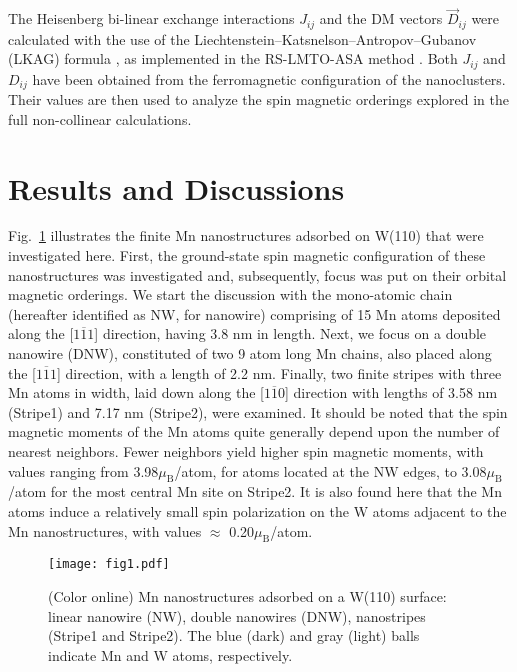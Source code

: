 \documentclass[prl,final,twocolumn]{revtex4-1}
\begin{document}
The Heisenberg bi-linear exchange interactions $J_{ij}$ and the DM vectors $\vec{D}_{ij}$ were calculated with the use of the Liechtenstein–Katsnelson–Antropov–Gubanov (LKAG) formula \cite{liechtensteinLocalSpinDensity1987,PhysRevB.61.8906},
% 
as  implemented in the RS-LMTO-ASA method \cite{frota2000exchange,szilvainteratomicExchangeInteractions2013,szilvaTheoryNoncollinearInteractions2017,cardias2020first,cardiasDzyaloshinskiiMoriyaInteractionAbsence2020}. 
Both $J_{ij}$ and $D_{ij}$ have been obtained from the ferromagnetic configuration of the nanoclusters.
Their values are then used to analyze
the spin magnetic orderings explored in the full non-collinear calculations. 
%  



\par
\section{Results and Discussions}

% 
Fig.~\ref{fig:systems} illustrates the finite Mn nanostructures adsorbed on W(110) that were investigated here. First, the ground-state spin magnetic configuration of these nanostructures was investigated and, subsequently, focus was put on their orbital magnetic orderings. We start the discussion with the mono-atomic chain (hereafter identified as NW, for nanowire) comprising of 15 Mn atoms deposited along the [$1\overline{1}1$] direction, having 3.8 nm in length. Next, we focus on a double nanowire (DNW), constituted of two 9 atom long Mn chains, also placed along the [$1\overline{1}1$] direction, with a length of 2.2 nm. Finally, two finite stripes with three Mn atoms in width, laid down along the [$1\overline{1}0$] direction with lengths of 3.58 nm (Stripe1) and 7.17 nm (Stripe2), were examined.    
It should be noted that the spin magnetic moments of the Mn atoms quite generally depend upon the number of nearest neighbors. Fewer neighbors yield higher spin magnetic moments, with values ranging from 3.98$\mu_\text{B}$/atom, for atoms located at the NW edges, to 3.08$\mu_\text{B}$/atom for the most central Mn site on Stripe2. It is also found here that the Mn atoms induce a relatively small spin polarization on the W atoms adjacent to the Mn nanostructures, with values  $\approx$ 0.20$\mu_\text{B}$/atom. 

\begin{figure}[htp]
\centering
\texttt{[image: fig1.pdf]}
\caption{
(Color online) Mn nanostructures adsorbed on a W(110) surface:
linear nanowire (NW), double nanowires (DNW), nanostripes (Stripe1 and Stripe2).
The blue (dark) and gray (light) balls indicate Mn and W atoms, respectively.}
\label{fig:systems}
\end{figure}
\end{document}
